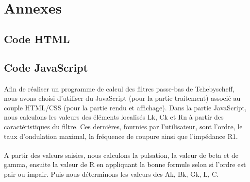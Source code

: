 \documentclass[a4paper,11pt]{article}
\begin{document}
    \clearpage


\section*{Annexes}
    \subsection{Code HTML}
        

    \clearpage

    \subsection{Code JavaScript}
        \paragraph{}
Afin de réaliser un programme de calcul des filtres passe-bas de Tchebyscheff, nous avons choisi d’utiliser du JavaScript (pour la partie traitement) associé au couple HTML/CSS (pour la partie rendu et affichage).
Dans la partie JavaScript, nous calculons les valeurs des éléments localisés Lk, Ck et Rn à partir des caractéristiques du filtre.
Ces dernières, fournies par l'utilisateur, sont l’ordre, le taux d’ondulation maximal, la fréquence de coupure ainsi que l’impédance R1.
        \paragraph{}
A partir des valeurs saisies, nous calculons la pulsation, la valeur de beta et de gamma, ensuite la valeur de R en appliquant la bonne formule selon si l’ordre est pair ou impair.
Puis nous déterminons les valeurs des Ak, Bk, Gk, L, C.
\end{document}
